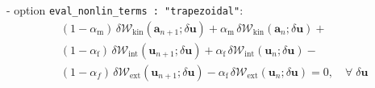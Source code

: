 \documentclass[a4paper,12pt]{report}
\begin{document}
\quad - option \verb.eval_nonlin_terms : "trapezoidal".:
\begin{equation}
\begin{aligned}
&(1-\alpha_{\mathrm{m}})\,\delta \mathcal{W}_{\mathrm{kin}}(\boldsymbol{a}_{n+1};\delta\boldsymbol{u}) + \alpha_{\mathrm{m}}\,\delta \mathcal{W}_{\mathrm{kin}}(\boldsymbol{a}_{n};\delta\boldsymbol{u}) + \\
& (1-\alpha_{\mathrm{f}})\,\delta \mathcal{W}_{\mathrm{int}}(\boldsymbol{u}_{n+1};\delta\boldsymbol{u}) + \alpha_{\mathrm{f}}\,\delta \mathcal{W}_{\mathrm{int}}(\boldsymbol{u}_{n};\delta\boldsymbol{u}) - \\
& (1-\alpha_{f})\,\delta \mathcal{W}_{\mathrm{ext}}(\boldsymbol{u}_{n+1};\delta\boldsymbol{u}) - \alpha_{\mathrm{f}}\,\delta \mathcal{W}_{\mathrm{ext}}(\boldsymbol{u}_{n};\delta\boldsymbol{u}) = 0, \quad \forall \; \delta\boldsymbol{u}\end{aligned}
\end{equation}
\end{document}
